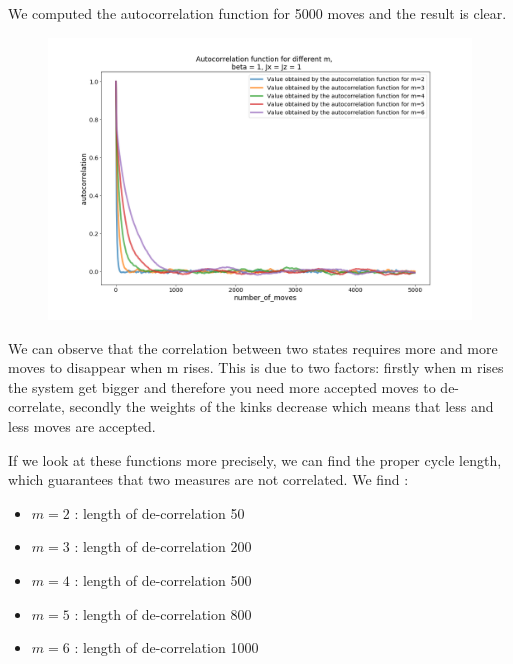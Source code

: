 \documentclass[a4paper,12pt]{article}
\begin{document}
	We computed the autocorrelation function for 5000 moves and the result is clear.
	\begin{figure}[H]
		\centering
		\includegraphics[scale=0.4]{autocorrelation_functionx=z=1_m2-6.png}
	\end{figure}

	We can observe that the correlation between two states requires more and more moves to disappear when m rises. This is due to two factors: firstly when m rises the system get bigger and therefore you need more accepted moves to de-correlate, secondly the weights of the kinks  decrease which means that less and less moves are accepted.

	If we look at these functions more precisely, we can find the proper cycle length, which guarantees that two measures are not correlated.
	We find :
	\begin{itemize}[label=$\star$]
		\item $m=2$ : length of de-correlation 50
		\item $m=3$ : length of de-correlation 200
		\item $m=4$ : length of de-correlation 500
		\item $m=5$ : length of de-correlation 800
		\item $m=6$ : length of de-correlation 1000
	\end{itemize}
\end{document}
